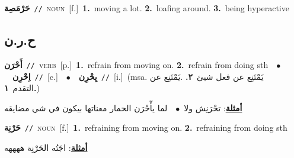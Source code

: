 \documentclass[10pt,a4paper,twoside]{article} %
\begin{document}
\begin{multicols}{2}
{\setlength\topsep{0pt}\textbf{\foreignlanguage{arabic}{حَرْمَصِة}}\ {\color{gray}\texttt{//}\color{black}}\ \textsc{noun}\ [f.]\ \textbf{1.}~moving a lot.  \textbf{2.}~loafing around.  \textbf{3.}~being hyperactive\ } \vspace{2mm}

\vspace{-3mm}
\subsection*{\color{blue}\foreignlanguage{arabic}{ح.ر.ن}\color{blue}{}} 

{\setlength\topsep{0pt}\textbf{\foreignlanguage{arabic}{أَحْرَن}}\ {\color{gray}\texttt{//}\color{black}}\ \textsc{verb}\ [p.]\ \textbf{1.}~refrain from moving on.  \textbf{2.}~refrain from doing sth\ \ $\bullet$\ \ \setlength\topsep{0pt}\textbf{\foreignlanguage{arabic}{اِحْرِن}}\ {\color{gray}\texttt{//}\color{black}}\ [c.]\ \ $\bullet$\ \ \setlength\topsep{0pt}\textbf{\foreignlanguage{arabic}{يِحْرِن}}\ {\color{gray}\texttt{//}\color{black}}\ [i.]\ \color{gray}(msa. \foreignlanguage{arabic}{يَمْتَنِع عن فعل شيئ}~\foreignlanguage{arabic}{\textbf{٢.}}  .\foreignlanguage{arabic}{يَمْتَنِع عن التقدم}~\foreignlanguage{arabic}{\textbf{١.}})\color{black}\  \begin{flushright}\color{gray}\foreignlanguage{arabic}{\textbf{\underline{\foreignlanguage{arabic}{أمثلة}}}: تحْرَنِش ولا\ $\bullet$\ \  لما يأّحْرَن الحمار معناتها بيكون في شي مضايقه}\end{flushright}\color{black}} \vspace{2mm}

{\setlength\topsep{0pt}\textbf{\foreignlanguage{arabic}{حَرْنِة}}\ {\color{gray}\texttt{//}\color{black}}\ \textsc{noun}\ [f.]\ \textbf{1.}~refraining from moving on.  \textbf{2.}~refraining from doing sth\  \begin{flushright}\color{gray}\foreignlanguage{arabic}{\textbf{\underline{\foreignlanguage{arabic}{أمثلة}}}: اجَتُه الحَرْنِة ههههه}\end{flushright}\color{black}} \vspace{2mm}


\end{multicols}
\end{document}
